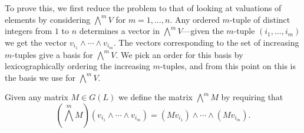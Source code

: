 \documentclass{amsart}
\theoremstyle{definition}
\def\bw{\bigwedge^m\!}
\begin{document}
  To prove this, we first reduce the problem to that of looking at valuations
  of elements by considering $\bw V$ for $m = 1, \ldots, n$.  Any ordered
  $m$-tuple of distinct integers from $1$ to $n$ determines a vector in $\bw
  V$---given the $m$-tuple $(i_1, \ldots, i_m)$ we get the vector $v_{i_1}
  \wedge \cdots \wedge v_{i_m}$.  The vectors corresponding to the set of
  increasing $m$-tuples give a basis for $\bw V$.  We pick an order for this
  basis by lexicographically ordering the increasing $m$-tuples, and from this
  point on this is the basis we use for $\bw V$.

  Given any matrix $M \in G(L)$ we define the matrix $\bw M$ by requiring that
  \begin{equation*}
    \left(\bw M\right) (v_{i_1} \wedge \cdots \wedge v_{i_m}) =
    (Mv_{i_1}) \wedge \cdots \wedge (Mv_{i_m}).
  \end{equation*}
\end{document}

